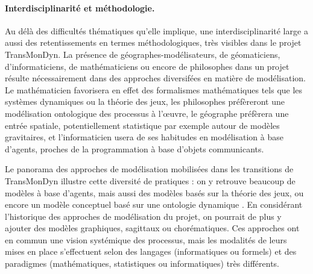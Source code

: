 \paragraph{Interdisciplinarité et méthodologie.}\label{par:interdisciplinarite-methodo}
Au délà des difficultés thématiques qu'elle implique, une interdisciplinarité large a aussi des retentissements en termes méthodologiques, très visibles dans le projet TransMonDyn.
La présence de géographes-modélisateurs, de géomaticiens, d'informaticiens, de mathématiciens ou encore de philosophes dans un projet résulte nécessairement dans des approches diversifées en matière de modélisation.
Le mathématicien favorisera en effet des formalismes mathématiques tels que les systèmes dynamiques ou la théorie des jeux, les philosophes préfèreront une modélisation ontologique des processus à l'œuvre, le géographe préfèrera une entrée spatiale, potentiellement statistique par exemple autour de modèles gravitaires, et l'informaticien usera de ses habitudes en modélisation à base d'agents, proches de la programmation à base d'objets communicants.

Le panorama des approches de modélisation mobilisées dans les transitions de TransMonDyn illustre cette diversité de pratiques : on y retrouve beaucoup de modèles à base d'agents, mais aussi des modèles basés sur la théorie des jeux, ou encore un modèle conceptuel basé sur une ontologie dynamique \autocite{favory_transition_2018}.
En considérant l'historique des approches de modélisation du projet, on pourrait de plus y ajouter des modèles graphiques, sagittaux ou chorématiques.
Ces approches ont en commun une vision systémique des processus, mais les modalités de leurs mises en place s'effectuent selon des langages (informatiques ou formels) et des paradigmes (mathématiques, statistiques ou informatiques) très différents.

